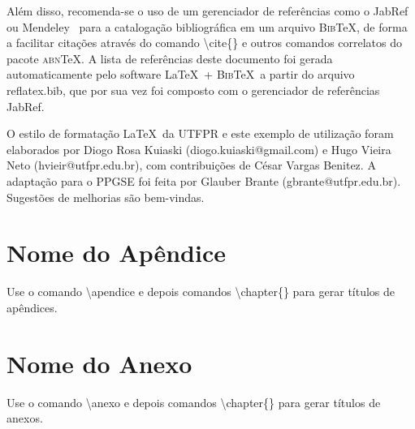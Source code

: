 \documentclass[openright]{normas-utf-tex} %
\begin{document}
Além disso, recomenda-se o uso de um gerenciador de referências como o JabRef~\cite{JabRef2009} ou Mendeley~\cite{Mendeley2009} para a catalogação bibliográfica em um arquivo \textsc{Bib}\TeX, de forma a facilitar citações através do comando {\ttfamily \textbackslash cite\{\}} e outros comandos correlatos do pacote \textsc{abn}\TeX. A lista de referências deste documento foi gerada automaticamente pelo software \LaTeX\ + \textsc{Bib}\TeX\ a partir do arquivo {\ttfamily reflatex.bib}, que por sua vez foi composto com o gerenciador de referências JabRef.

O estilo de formatação \LaTeX\ da UTFPR e este exemplo de utilização foram elaborados por Diogo Rosa Kuiaski (diogo.kuiaski@gmail.com) e Hugo Vieira Neto (hvieir@utfpr.edu.br), com contribuições de César Vargas Benitez. A adaptação para o PPGSE foi feita por Glauber Brante (gbrante@utfpr.edu.br). Sugestões de melhorias são bem-vindas.



\clearpage %
\label{bibstart}
\label{bibend}


\apendice
\chapter{Nome do Apêndice}
\label{chap:apendice}

Use o comando {\ttfamily \textbackslash apendice} e depois comandos {\ttfamily \textbackslash chapter\{\}}
para gerar títulos de apêndices.


\anexo
\chapter{Nome do Anexo}
\label{chap:anexo}

Use o comando {\ttfamily \textbackslash anexo} e depois comandos {\ttfamily \textbackslash chapter\{\}}
para gerar títulos de anexos.
\end{document}

